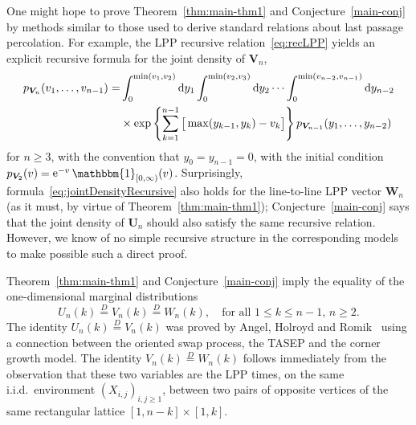 \documentclass[a4paper,reqno,12pt]{amsart}
\theoremstyle{plain}
\theoremstyle{definition}
\newcommand{\diff}{\mathop{}\!\mathrm{d}}
\newcommand{\1}{\mathbbm{1}}
\DeclareMathOperator{\e}{\mathrm{e}}
\begin{document}
One might hope to prove Theorem~\ref{thm:main-thm1} and Conjecture~\ref{main-conj} by methods similar to those used to derive standard relations about last passage percolation. 
For example, the LPP recursive relation~\eqref{eq:recLPP} yields an explicit recursive formula for the joint density of $\bm{V}_n$,
\begin{equation}
\label{eq:jointDensityRecursive}
\begin{split}
p_{\bm{V}_n}(v_1,\dots,v_{n-1})
= &\int_0^{\min(v_1, v_2)} \diff y_1
\int_0^{\min(v_2, v_3)} \diff y_2
\cdots
\int_0^{\min(v_{n-2}, v_{n-1})} \diff y_{n-2} \\
&\small\times\exp\left\{\sum_{k=1}^{n-1} \big[\max(y_{k-1}, y_k) - v_k\big]\right\} p_{\bm{V}_{n-1}}(y_1,\dots, y_{n-2})
\end{split}
\end{equation}
for $n\geq 3$, with the convention that $y_0=y_{n-1}=0$, with the initial condition $p_{\bm{V}_{2}}(v) = \e^{-v} \1_{[0,\infty)}(v)$.
Surprisingly, formula~\eqref{eq:jointDensityRecursive} also holds for the line-to-line LPP vector $\bm{W}_n$ (as it must, by virtue of Theorem~\ref{thm:main-thm1}); Conjecture~\ref{main-conj} says that the joint density of $\bm{U}_n$ should also satisfy the same recursive relation.
However, we know of no simple recursive structure in the corresponding models to make possible such a direct proof.

Theorem~\ref{thm:main-thm1} and Conjecture~\ref{main-conj}  imply the equality of the one-dimensional marginal distributions
\begin{equation}
\label{eq:one-dim-marginal}
U_n(k) \overset{D}{=} V_n(k) \overset{D}{=} W_n(k),\quad\text{for all $1\le k\le n-1$, $n\geq2$}.
\end{equation}
The identity  $U_n(k) \overset{D}{=} V_n(k)$ was proved by Angel, Holroyd and Romik~\cite{angelHolroydRomik09} using a connection between the oriented swap process, the TASEP and the corner growth model.
The identity $V_n(k) \overset{D}{=} W_n(k)$ follows immediately from the observation that these two variables are the LPP times, on the same i.i.d.\ environment $(X_{i,j})_{i,j\ge 1}$, between two pairs of opposite vertices of the same rectangular lattice $[1,n-k] \times [1,k]$.
\end{document}
